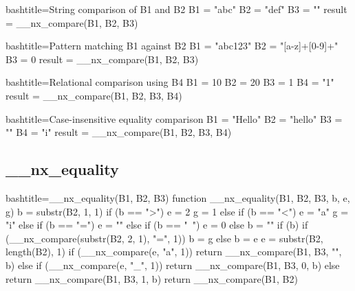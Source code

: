 \begin{NexCodeBox}{bash}{title={String comparison of B1 and B2}}
	B1 = "abc"
	B2 = "def"
	B3 = ""
	result = __nx_compare(B1, B2, B3)
\end{NexCodeBox}

\begin{NexCodeBox}{bash}{title={Pattern matching B1 against B2}}
	B1 = "abc123"
	B2 = "[a-z]+[0-9]+"
	B3 = 0
	result = __nx_compare(B1, B2, B3)
\end{NexCodeBox}

\begin{NexCodeBox}{bash}{title={Relational comparison using B4}}
	B1 = 10
	B2 = 20
	B3 = 1
	B4 = "1"
	result = __nx_compare(B1, B2, B3, B4)
\end{NexCodeBox}

\begin{NexCodeBox}{bash}{title={Case-insensitive equality comparison}}
	B1 = "Hello"
	B2 = "hello"
	B3 = ""
	B4 = "i"
	result = __nx_compare(B1, B2, B3, B4)
\end{NexCodeBox}


\newpage
\subsection{__nx_equality}
\label{__nx_equality}
\begin{NexCodeBox}{bash}{title={__nx_equality(B1, B2, B3)}}
function __nx_equality(B1, B2, B3,	b, e, g) {
	b = substr(B2, 1, 1)
	if (b == ">") {
		e = 2
		g = 1
	} else if (b == "<") {
		e = "a"
		g = "i"
	} else if (b == "=") {
		e = ""
	} else if (b == "~") {
		e = 0
	} else {
		b = ""
	}
	if (b) {
		if (__nx_compare(substr(B2, 2, 1), "=", 1)) {
			b = g
		} else {
			b = e
		}
		e = substr(B2, length(B2), 1)
		if (__nx_compare(e, "a", 1))
			return __nx_compare(B1, B3, "", b)
		else if (__nx_compare(e, "_", 1))
			return __nx_compare(B1, B3, 0, b)
		else
			return __nx_compare(B1, B3, 1, b)
	}
	return __nx_compare(B1, B2)
}
\end{NexCodeBox}

